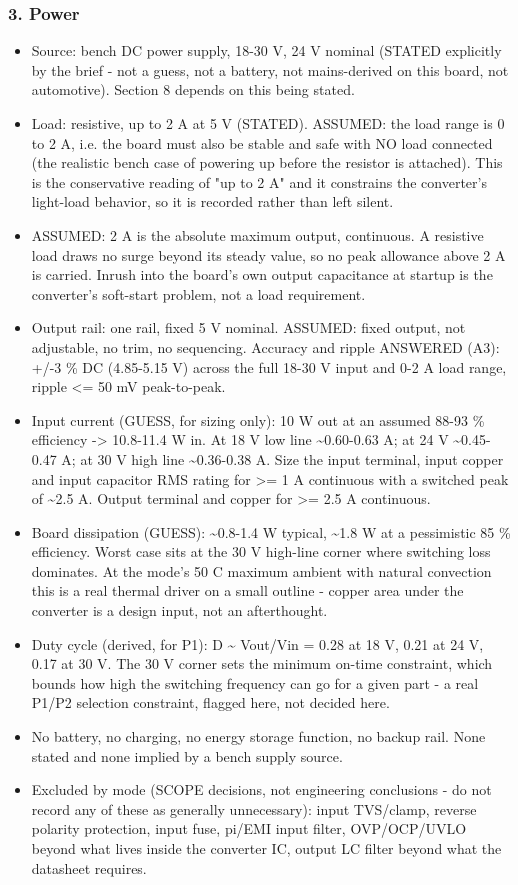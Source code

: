 \documentclass[11pt,a4paper]{article}
\begin{document}
\subsubsection*{3. Power}
\begin{itemize}
\item Source: bench DC power supply, 18-30 V, 24 V nominal (STATED
explicitly by the brief - not a guess, not a battery, not mains-derived
on this board, not automotive). Section 8 depends on this being stated.
\item Load: resistive, up to 2 A at 5 V (STATED). ASSUMED: the load range is
0 to 2 A, i.e. the board must also be stable and safe with NO load
connected (the realistic bench case of powering up before the resistor
is attached). This is the conservative reading of "up to 2 A" and it
constrains the converter's light-load behavior, so it is recorded rather
than left silent.
\item ASSUMED: 2 A is the absolute maximum output, continuous. A resistive
load draws no surge beyond its steady value, so no peak allowance above
2 A is carried. Inrush into the board's own output capacitance at
startup is the converter's soft-start problem, not a load requirement.
\item Output rail: one rail, fixed 5 V nominal. ASSUMED: fixed output, not
adjustable, no trim, no sequencing. Accuracy and ripple ANSWERED (A3):
+/-3 \% DC (4.85-5.15 V) across the full 18-30 V input and 0-2 A load
range, ripple \textless{}= 50 mV peak-to-peak.
\item Input current (GUESS, for sizing only): 10 W out at an assumed 88-93 \%
efficiency -\textgreater{} 10.8-11.4 W in. At 18 V low line \textasciitilde{}0.60-0.63 A; at 24 V
\textasciitilde{}0.45-0.47 A; at 30 V high line \textasciitilde{}0.36-0.38 A. Size the input terminal,
input copper and input capacitor RMS rating for \textgreater{}= 1 A continuous with
a switched peak of \textasciitilde{}2.5 A. Output terminal and copper for \textgreater{}= 2.5 A
continuous.
\item Board dissipation (GUESS): \textasciitilde{}0.8-1.4 W typical, \textasciitilde{}1.8 W at a pessimistic
85 \% efficiency. Worst case sits at the 30 V high-line corner where
switching loss dominates. At the mode's 50 C maximum ambient with
natural convection this is a real thermal driver on a small outline -
copper area under the converter is a design input, not an afterthought.
\item Duty cycle (derived, for P1): D \textasciitilde{} Vout/Vin = 0.28 at 18 V, 0.21 at
24 V, 0.17 at 30 V. The 30 V corner sets the minimum on-time
constraint, which bounds how high the switching frequency can go for a
given part - a real P1/P2 selection constraint, flagged here, not
decided here.
\item No battery, no charging, no energy storage function, no backup rail.
None stated and none implied by a bench supply source.
\item Excluded by mode (SCOPE decisions, not engineering conclusions - do not
record any of these as generally unnecessary): input TVS/clamp, reverse
polarity protection, input fuse, pi/EMI input filter, OVP/OCP/UVLO
beyond what lives inside the converter IC, output LC filter beyond what
the datasheet requires.
\end{itemize}
\end{document}
